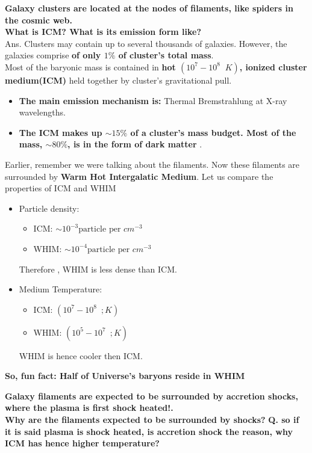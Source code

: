 \documentclass[11pt]{report}
\newcommand{\cbox}{tcolorbox}
\begin{document}
\textbf{Galaxy clusters are located at the nodes of filaments, like spiders in the cosmic web.}\\
\textbf{What is ICM? What is its emission form like?}\\
Ans. Clusters may contain up to several thousands of galaxies. However, the galaxies comprise \textbf{of only $1\%$ of cluster's total mass}.\\
Most of the baryonic mass is contained in \textbf{hot $(10^7-10^8 \;\; K)$, ionized cluster medium(ICM)} held together by cluster's gravitational pull.\\
\begin{itemize}
\item \textbf{The main emission mechanism is:} Thermal Bremstrahlung at X-ray wavelengths. 
\item \textbf{ The ICM makes up $\sim 15\%$ of a cluster’s mass budget. Most of the mass, $\sim 80\%$, is in the form of dark matter }.
\end{itemize}
Earlier, remember we were talking about the filaments. Now these filaments are surrounded by \textbf{Warm Hot Intergalatic Medium}. Let us compare the properties of ICM and WHIM
\begin{itemize}
\item Particle density: 
\begin{itemize}
\item ICM: $\sim 10^{-3} \text{particle per } cm^{-3}$
\item WHIM: $\sim 10^{-4} \text{particle per } cm^{-3}$
\end{itemize} 
Therefore , WHIM is less dense than ICM.
\item Medium Temperature:
\begin{itemize}
\item ICM: $(10^7 -10^8 \;\ ; K)$
\item WHIM: $(10^5 -10^7 \;\ ; K)$
\end{itemize}
WHIM is hence cooler then ICM.
\end{itemize}
\begin{\cbox}
\textbf{So, fun fact: Half of Universe's baryons reside in WHIM}
\end{\cbox}
\begin{\cbox}
\textbf{Galaxy filaments are expected to be surrounded by accretion shocks, where the plasma is first shock heated!.}\\
\textbf{Why are the filaments expected to be surrounded by shocks?}
\textbf{Q. so if it is said plasma is shock heated, is accretion shock the reason, why ICM has hence higher temperature?}
\end{\cbox}
\end{document}
